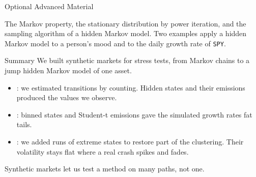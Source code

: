 \documentclass[aspectratio=169,11pt]{beamer}
\newcommand{\repo}{https://github.com/varnerlab/CHEME-5660-CourseRepository-Fall-2026/blob/main/lectures/week-13/L13a}
\begin{document}
\begin{frame}{Optional Advanced Material}
  \vspace{0.4em}
  {\normalsize\textbf{} \par
  \href{\repo/advanced/markov/CHEME-5660-L13a-Lecture-MarkovModels-Fall-2026.ipynb}{}}

  \vspace{0.6em}
  The Markov property, the stationary distribution by power iteration, and the sampling
  algorithm of a hidden Markov model. Two examples apply a hidden Markov model to a
  person's mood and to the daily growth rate of \texttt{SPY}.
\end{frame}

\begin{frame}{Summary}
  \vspace{0.3em}
  We built synthetic markets for stress tests, from Markov chains to a jump hidden
  Markov model of one asset.

  \vspace{0.4em}
  {\large\textbf{}}
  \begin{itemize}\setlength{\itemsep}{0.4em}
    \item {}: we estimated transitions by
      counting. Hidden states and their emissions produced the values we observe.
    \item {}: binned states and Student-t emissions gave the simulated
      growth rates fat tails.
    \item {}: we added runs of extreme states to restore part of
      the clustering. Their volatility stays flat where a real crash spikes and fades.
  \end{itemize}
  \vspace{0.3em}
  Synthetic markets let us test a method on many paths, not one.
\end{frame}
\end{document}
